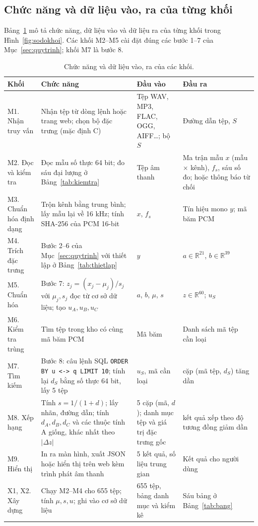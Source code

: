 \documentclass[11pt,a4paper]{article}
\begin{document}
\subsection{Chức năng và dữ liệu vào, ra của từng khối}
Bảng~\ref{tab:khoi} mô tả chức năng, dữ liệu vào và dữ liệu ra của từng khối trong Hình~\ref{fig:sodokhoi}. Các khối M2--M5 cài đặt đúng các bước 1--7 của Mục~\ref{sec:quytrinh}; khối M7 là bước 8.
\begin{table}[htbp]
\centering\footnotesize
\caption{Chức năng và dữ liệu vào, ra của các khối.}\label{tab:khoi}
\begin{tabularx}{\textwidth}{>{\raggedright}p{}>{\raggedright}X>{\raggedright}p{}>{\raggedright\arraybackslash}p{}}
\toprule
Khối & Chức năng & Đầu vào & Đầu ra\\\midrule
M1. Nhận truy vấn & Nhận tệp từ dòng lệnh hoặc trang web; chọn bộ đặc trưng (mặc định C) & Tệp WAV, MP3, FLAC, OGG, AIFF\ldots; bộ $S$ & Đường dẫn tệp, $S$\\
M2. Đọc và kiểm tra & Đọc mẫu số thực 64 bit; đo sáu đại lượng ở Bảng~\ref{tab:kiemtra} & Tệp âm thanh & Ma trận mẫu $x$ (mẫu $\times$ kênh), $f_s$, sáu số đo; hoặc thông báo từ chối\\
M3. Chuẩn hóa định dạng & Trộn kênh bằng trung bình; lấy mẫu lại về 16 kHz; tính SHA-256 của PCM 16-bit & $x$, $f_s$ & Tín hiệu mono $y$; mã băm PCM\\
M4. Trích đặc trưng & Bước 2--6 của Mục~\ref{sec:quytrinh} với thiết lập ở Bảng~\ref{tab:thietlap} & $y$ & $a\in\mathbb R^{21}$, $b\in\mathbb R^{39}$\\
M5. Chuẩn hóa & Bước 7: $z_j=(x_j-\mu_j)/s_j$ với $\mu_j, s_j$ đọc từ cơ sở dữ liệu; tạo $u_A,u_B,u_C$ & $a$, $b$, $\mu$, $s$ & $z\in\mathbb R^{60}$; $u_S$\\
M6. Kiểm tra trùng & Tìm tệp trong kho có cùng mã băm PCM & Mã băm & Danh sách mã tệp cần loại\\
M7. Tìm kiếm & Bước 8: câu lệnh SQL \texttt{ORDER BY u <-> q LIMIT 10}; tính lại $d_S$ bằng số thực 64 bit, lấy 5 tệp & $u_S$, mã cần loại & 5 cặp (mã tệp, $d_S$) tăng dần\\
M8. Xếp hạng & Tính $s=1/(1+d)$; lấy nhãn, đường dẫn; tính $d_A,d_B,d_C$ và các thuộc tính A giống, khác nhất theo $|\Delta z|$ & 5 cặp (mã, $d$); danh mục tệp và giá trị đặc trưng gốc & 5 kết quả xếp theo độ tương đồng giảm dần\\
M9. Hiển thị & In ra màn hình, xuất JSON hoặc hiển thị trên web kèm trình phát âm thanh & 5 kết quả, số liệu trung gian & Kết quả cho người dùng\\\midrule
X1, X2. Xây dựng & Chạy M2--M4 cho 655 tệp; tính $\mu,s,u$; ghi vào cơ sở dữ liệu & 655 tệp, bảng danh mục và kiểm kê & Sáu bảng ở Bảng~\ref{tab:bang}\\\bottomrule
\end{tabularx}
\end{table}
\end{document}
